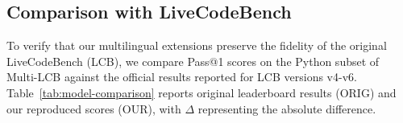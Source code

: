 \documentclass{llmxive}
\begin{document}




\subsection{Comparison with LiveCodeBench}
\label{subsec_exp_comparison_lcb}



To verify that our multilingual extensions preserve the fidelity of the original LiveCodeBench (LCB), we compare Pass@1 scores on the Python subset of Multi-LCB against the official results reported for LCB versions v4-v6. 
Table~\ref{tab:model-comparison} reports original leaderboard results (ORIG) and our reproduced scores (OUR), with $\Delta$ representing the absolute difference.
\end{document}
